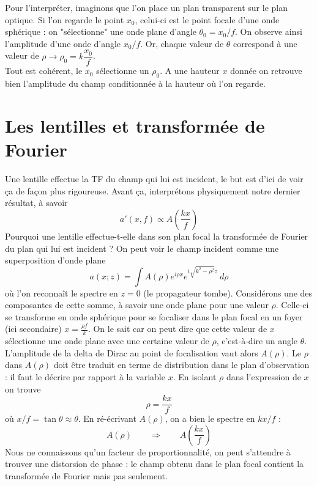 Pour l'interpréter, imaginons que l'on place un plan transparent sur le plan optique. Si l'on regarde 
le point $x_0$, celui-ci est le point focale d'une onde sphérique : on "sélectionne" une onde plane 
d'angle $\theta_0 = x_0/f$. On observe ainsi l'amplitude d'une onde d'angle $x_0/f$. Or, chaque valeur 
de $\theta$ correspond à une valeur de $\rho \longrightarrow \rho_0 = k\dfrac{x_0}{f}$.\\

Tout est cohérent, le $x_0$ sélectionne un $\rho_0$. A une hauteur $x$ donnée on retrouve bien 
l'amplitude du champ conditionnée à la hauteur où l'on regarde. 


\newpage
\section{Les lentilles et transformée de Fourier}
Une lentille effectue la TF du champ qui lui est incident, le but est d'ici de voir ça de façon 
plus rigoureuse. Avant ça, interprétons physiquement notre dernier résultat, à savoir
\begin{equation}
a'(x,f)\propto A\left(\frac{kx}{f}\right)
\end{equation}
Pourquoi une lentille effectue-t-elle dans son plan focal la transformée de Fourier du plan qui 
lui est incident ? On peut voir le champ incident comme une superposition d'onde plane
\begin{equation}
a(x;z) = \int A(\rho)e^{i\rho x}e^{i\sqrt{k^2-\rho^2}z}\ d\rho
\end{equation}
où l'on reconnaît le spectre en $z=0$ (le propagateur tombe).  Considérons une des composantes de 
cette somme, à savoir une onde plane pour une valeur $\rho$. Celle-ci se transforme en onde 
sphérique pour se focaliser dans le plan focal en un foyer (ici secondaire) $x=\frac{\rho f}{k}$. 
On le sait car on peut dire que cette valeur de $x$ sélectionne une onde plane avec une certaine 
valeur de $\rho$, c'est-à-dire un angle $\theta$. L'amplitude de la delta de Dirac au point de 
focalisation vaut alors $A(\rho)$. Le $\rho$ dans $A(\rho)$ doit être traduit en terme de distribution 
dans le plan d'observation : il faut le décrire par rapport à la variable $x$. En isolant $\rho$ 
dans l'expression de $x$ on trouve
\begin{equation}
\rho = \dfrac{kx}{f}
\end{equation}
où $x/f = \tan\theta \approx \theta$. En ré-écrivant $A(\rho)$, on a bien le spectre en $kx/f$ :
\begin{equation}
A(\rho)\qquad\Longrightarrow\qquad A\left(\frac{kx}{f}\right)
\end{equation}
Nous ne connaissons qu'un facteur de proportionnalité, on peut s'attendre à trouver une distorsion 
de phase : le champ obtenu dans le plan focal contient la transformée de Fourier mais pas seulement.\\


